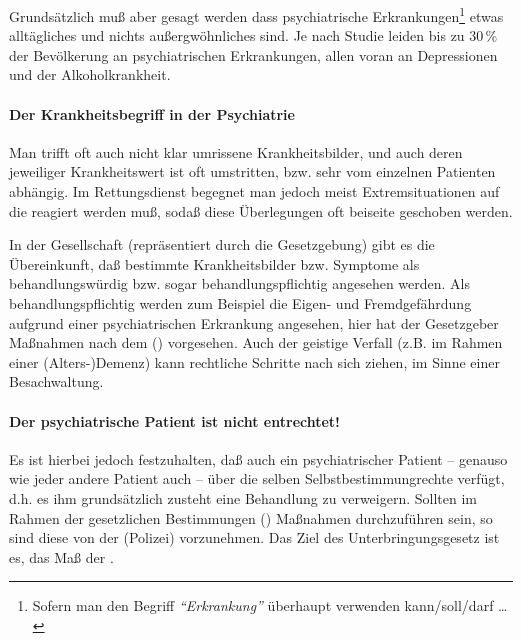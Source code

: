 Grundsätzlich muß aber gesagt werden dass psychiatrische
Erkrankungen\footnote{Sofern man den Begriff
\emph{"`Erkrankung"'} überhaupt verwenden kann/soll/darf \ldots}
etwas alltägliches und nichts außergwöhnliches sind. Je nach Studie leiden bis zu 30\,\% der Bevölkerung an psychiatrischen Erkrankungen, allen voran an
Depressionen und der Alkoholkrankheit. 



\paragraph{Der Krankheitsbegriff in der Psychiatrie} Man
trifft oft auch nicht klar umrissene Krankheitsbilder, und auch deren jeweiliger Krankheitswert ist oft umstritten,
bzw. sehr vom einzelnen Patienten abhängig. Im Rettungsdienst begegnet man jedoch meist
Extremsituationen auf die reagiert werden muß, sodaß 
diese Überlegungen oft beiseite geschoben werden. 

In
der Gesellschaft (repräsentiert durch die Gesetzgebung) gibt es die Übereinkunft, daß bestimmte
Krankheitsbilder bzw. Symptome als behandlungswürdig bzw.
sogar behandlungspflichtig angesehen werden. Als
behandlungspflichtig werden zum Beispiel die Eigen- und
Fremdgefährdung aufgrund einer psychiatrischen Erkrankung
angesehen, hier hat der Gesetzgeber Maßnahmen nach dem
 () vorgesehen. Auch der
geistige Verfall (z.B. im Rahmen einer (Alters-)Demenz) kann
rechtliche Schritte nach sich ziehen, im Sinne einer
Besachwaltung. 

\paragraph{Der psychiatrische Patient ist nicht entrechtet!}
Es ist hierbei jedoch festzuhalten, daß auch ein psychiatrischer Patient -- genauso wie jeder andere
Patient auch -- über die selben Selbstbestimmungrechte
verfügt, d.h. es ihm grundsätzlich zusteht eine Behandlung
zu verweigern. Sollten im Rahmen der gesetzlichen
Bestimmungen () Maßnahmen
durchzuführen sein, so sind diese von der 
(Polizei) vorzunehmen. Das Ziel des Unterbringungsgesetz
ist es, das Maß der . 




